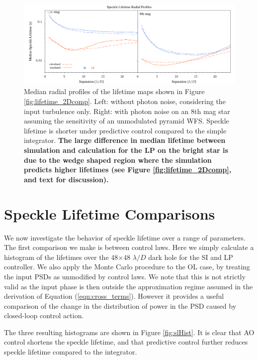 \documentclass[10pt,preprint]{aastex631}
\begin{document}
\begin{figure}
\hspace{-0.3in}
\includegraphics[width=6.5in]{lifetimesRP.pdf}
\caption{Median radial profiles of the lifetime maps shown in Figure \ref{fig:lifetime_2Dcomp}.  Left: without photon noise, considering the input turbulence only.  Right: with photon noise on an 8th mag star assuming the sensitivity of an unmodulated pyramid WFS. Speckle lifetime is shorter under predictive control compared to the simple integrator. \textbf{The large difference in median lifetime between simulation and calculation for the LP on the bright star is due to the wedge shaped region where the simulation predicts higher lifetimes (see Figure \ref{fig:lifetime_2Dcomp}, and text for discussion).}  \label{fig:lifetime_radprof}}
\end{figure}

\clearpage

\section{Speckle Lifetime Comparisons}
\label{sec:trends}

We now investigate the behavior of speckle lifetime over a range of parameters.  The first comparison we make is between control laws.  Here we simply calculate a histogram of the lifetimes over the 48$\times$48 $\lambda/D$ dark hole for the SI and LP controller.  We also apply the Monte Carlo procedure to the OL case, by treating the input PSDs as unmodified by control laws.  We note that this is not strictly valid as the input phase is then outside the approximation regime assumed in the derivation of Equation (\ref{eqn:cross_terms}).  However it provides a useful comparison of the change in the distribution of power in the PSD caused by closed-loop control action. 

The three resulting histograms are shown in Figure \ref{fig:slHist}.  It is clear that AO control shortens the speckle lifetime, and that predictive control further reduces speckle lifetime compared to the integrator.
\end{document}
